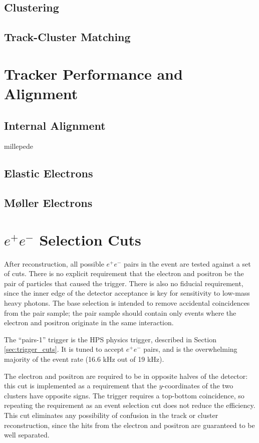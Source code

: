 \subsection{Clustering}
\label{sec:clustering}

\subsection{Track-Cluster Matching}
\label{sec:matching}
\section{Tracker Performance and Alignment}
\subsection{Internal Alignment}
\label{sec:internal_alignment}
millepede
\subsection{Elastic Electrons}
\label{sec:target_z}
\subsection{M{\o}ller Electrons}
\label{sec:mollers}

\section{\texorpdfstring{$e^+e^-$}{e+e-} Selection Cuts}
\label{sec:event_selection}
After reconstruction, all possible $e^+e^-$ pairs in the event are tested against a set of cuts.
There is no explicit requirement that the electron and positron be the pair of particles that caused the trigger.
There is also no fiducial requirement, since the inner edge of the detector acceptance is key for sensitivity to low-mass heavy photons.
The base selection is intended to remove accidental coincidences from the pair sample; the pair sample should contain only events where the electron and positron originate in the same interaction.

The ``pairs-1'' trigger is the HPS physics trigger, described in Section \ref{sec:trigger_cuts}.
It is tuned to accept $e^+e^-$ pairs, and is the overwhelming majority of the event rate (16.6 kHz out of 19 kHz).

The electron and positron are required to be in opposite halves of the detector: this cut is implemented as a requirement that the $y$-coordinates of the two clusters have opposite signs.
The trigger requires a top-bottom coincidence, so repeating the requirement as an event selection cut does not reduce the efficiency.
This cut eliminates any possibility of confusion in the track or cluster reconstruction, since the hits from the electron and positron are guaranteed to be well separated.

